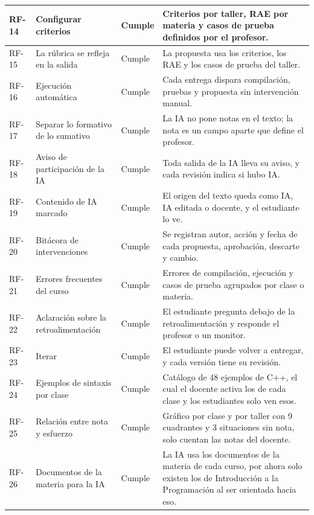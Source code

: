 \documentclass[letterpaper, 10 pt, conference]{ieeeconf}
\begin{document}
\begin{table}[t]
\begin{tabular}{|p{1.2cm}|p{4.6cm}|p{2.2cm}|p{8.2cm}|}
RF-14 & Configurar criterios & Cumple & Criterios por taller, RAE por materia y casos de prueba definidos por el profesor. \\ \hline
RF-15 & La rúbrica se refleja en la salida & Cumple & La propuesta usa los criterios, los RAE y los casos de prueba del taller. \\ \hline
RF-16 & Ejecución automática & Cumple & Cada entrega dispara compilación, pruebas y propuesta sin intervención manual. \\ \hline
RF-17 & Separar lo formativo de lo sumativo & Cumple & La IA no pone notas en el texto; la nota es un campo aparte que define el profesor. \\ \hline
RF-18 & Aviso de participación de la IA & Cumple & Toda salida de la IA lleva su aviso, y cada revisión indica si hubo IA. \\ \hline
RF-19 & Contenido de IA marcado & Cumple & El origen del texto queda como IA, IA editada o docente, y el estudiante lo ve. \\ \hline
RF-20 & Bitácora de intervenciones & Cumple & Se registran autor, acción y fecha de cada propuesta, aprobación, descarte y cambio. \\ \hline
RF-21 & Errores frecuentes del curso & Cumple & Errores de compilación, ejecución y casos de prueba agrupados por clase o materia. \\ \hline
RF-22 & Aclaración sobre la retroalimentación & Cumple & El estudiante pregunta debajo de la retroalimentación y responde el profesor o un monitor. \\ \hline
RF-23 & Iterar & Cumple & El estudiante puede volver a entregar, y cada versión tiene su revisión. \\ \hline
RF-24 & Ejemplos de sintaxis por clase & Cumple & Catálogo de 48 ejemplos de C++, el cual el docente activa los de cada clase y los estudiantes solo ven esos. \\ \hline
RF-25 & Relación entre nota y esfuerzo & Cumple & Gráfico por clase y por taller con 9 cuadrantes y 3 situaciones sin nota, solo cuentan las notas del docente. \\ \hline
RF-26 & Documentos de la materia para la IA & Cumple & La IA usa los documentos de la materia de cada curso, por ahora solo existen los de Introducción a la Programación al ser orientada hacia eso. \\ \hline
\end{tabular}
\end{table}
\end{document}
